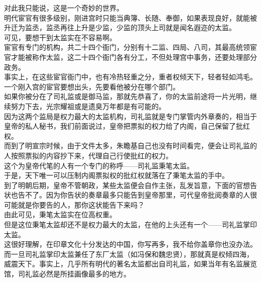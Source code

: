 \begin{multicols}{\theparacolNo}
对此我只能说，这是一个奇妙的世界。\\

明代宦官有很多级别，刚进宫时只能当典簿、长随、奉御，如果表现良好，就能被升迁为监丞，监丞再往上升是少监，少监的顶头上司就是闻名遐迩的太监。\\

可见，要想干到太监实在不容易啊。\\

宦官有专门的机构，共二十四个衙门，分别有十二监、四局、八司，其最高统领宦官才能被称作太监，这二十四个衙门各有分工，不但处理宫中事务，还要处理部分政务。\\

事实上，在这些宦官衙门中，也有冷热轻重之分，重者权倾天下，轻者轻如鸿毛。一个刚入宫的宦官要想出头，先要看他被分在哪个部门。\\

如果你被分在了司礼监或是御马监，那就先恭喜了，你的太监前途将一片光明，继续努力下去，光宗耀祖或是遗臭万年都是有可能的。\\

因为这两个监局是权力最大的太监机构，司礼监就是专门掌管内外章奏的，相当于皇帝的私人秘书，我们前面说过，皇帝把票拟的权力给了内阁，自己保留了批红权。\\

而到了明宣宗时候，由于文件太多，朱瞻基自己也没有时间看完，便会让司礼监的人按照票拟的内容抄下来，代理自己行使批红的权力。\\

这个为皇帝代笔的人有一个专门的称呼——司礼监秉笔太监。\\

于是，天下唯一可以压制内阁票拟权的批红权就落在了秉笔太监的手中。\\

到了明朝后期，皇帝不管朝政，某些太监便会自作主张，乱发旨意，下面的官想告状也告不了。因为你告状的奏章最多只能告到皇帝那里，可代皇帝批阅奏章的人很可能就是你要告的人，那你这状能告下来吗？\\

由此可见，秉笔太监实在位高权重。\\

但是这位秉笔太监却还不是权力最大的太监，在他的上头还有一个——司礼监掌印太监。\\

这很好理解，在印章文化十分发达的中国，你写再多，我不给你盖章你也没办法。\\

而一旦司礼监掌印太监兼任了东厂太监（如冯保和魏忠贤），那就真是权倾四海，威震天下。事实上，几乎所有明代的著名太监都出自司礼监，如果当年有名监展览馆，司礼监必然是所挂画像最多的地方。\\


\end{multicols}
